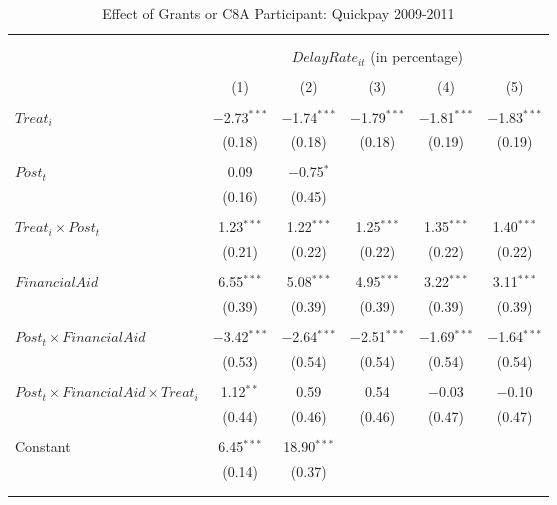 \documentclass[
]{article}
\begin{document}
\begin{table}[H] \centering 
  \caption{Effect of Grants or C8A Participant: Quickpay 2009-2011} 
  \label{} 
\small 
\begin{tabular}{@{\extracolsep{-2pt}}lccccc} 
\\[-1.8ex]\hline 
\hline \\[-1.8ex] 
\\[-1.8ex] & \multicolumn{5}{c}{$DelayRate_{it}$ (in percentage)} \\ 
\\[-1.8ex] & (1) & (2) & (3) & (4) & (5)\\ 
\hline \\[-1.8ex] 
 $Treat_i$ & $-$2.73$^{***}$ & $-$1.74$^{***}$ & $-$1.79$^{***}$ & $-$1.81$^{***}$ & $-$1.83$^{***}$ \\ 
  & (0.18) & (0.18) & (0.18) & (0.19) & (0.19) \\ 
  & & & & & \\ 
 $Post_t$ & 0.09 & $-$0.75$^{*}$ &  &  &  \\ 
  & (0.16) & (0.45) &  &  &  \\ 
  & & & & & \\ 
 $Treat_i \times Post_t$ & 1.23$^{***}$ & 1.22$^{***}$ & 1.25$^{***}$ & 1.35$^{***}$ & 1.40$^{***}$ \\ 
  & (0.21) & (0.22) & (0.22) & (0.22) & (0.22) \\ 
  & & & & & \\ 
 $FinancialAid$ & 6.55$^{***}$ & 5.08$^{***}$ & 4.95$^{***}$ & 3.22$^{***}$ & 3.11$^{***}$ \\ 
  & (0.39) & (0.39) & (0.39) & (0.39) & (0.39) \\ 
  & & & & & \\ 
 $Post_t \times FinancialAid$ & $-$3.42$^{***}$ & $-$2.64$^{***}$ & $-$2.51$^{***}$ & $-$1.69$^{***}$ & $-$1.64$^{***}$ \\ 
  & (0.53) & (0.54) & (0.54) & (0.54) & (0.54) \\ 
  & & & & & \\ 
 $Post_t \times FinancialAid \times Treat_i$ & 1.12$^{**}$ & 0.59 & 0.54 & $-$0.03 & $-$0.10 \\ 
  & (0.44) & (0.46) & (0.46) & (0.47) & (0.47) \\ 
  & & & & & \\ 
 Constant & 6.45$^{***}$ & 18.90$^{***}$ &  &  &  \\ 
  & (0.14) & (0.37) &  &  &  \\ 
  & & & & & \\ 
\hline \\[-1.8ex] 

\end{tabular}
\end{table}
\end{document}
